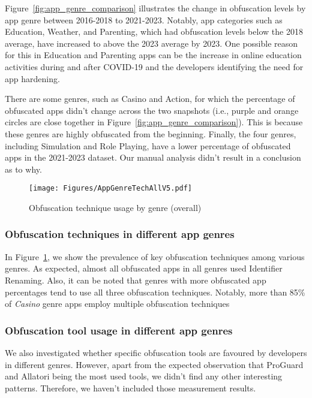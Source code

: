 Figure~\ref{fig:app_genre_comparison} illustrates the change in obfuscation levels by app genre between 2016-2018 to 2021-2023. Notably, app categories such as Education, Weather, and Parenting, which had obfuscation levels below the 2018 average, have increased to above the 2023 average by 2023. One possible reason for this in Education and Parenting apps can be the increase in online education activities during and after COVID-19 and the developers identifying the need for app hardening.

There are some genres, such as Casino and Action, for which the percentage of obfuscated apps didn't change across the two snapshots (i.e., purple and orange circles are close together in Figure~\ref{fig:app_genre_comparison}). This is because these genres are highly obfuscated from the beginning. Finally, the four genres, including Simulation and Role Playing, have a lower percentage of obfuscated apps in the 2021-2023 dataset. Our manual analysis didn't result in a conclusion as to why.


\begin{figure}[!h]
    \centering
    \texttt{[image: Figures/AppGenreTechAllV5.pdf]}
    \caption{Obfuscation technique usage by genre (overall)}
    \label{fig:app_genre_all_tech}
\end{figure}


\subsubsection{Obfuscation techniques in different app genres} In Figure~\ref{fig:app_genre_all_tech}, we show the prevalence of key obfuscation techniques among various genres. As expected, almost all obfuscated apps in all genres used  Identifier Renaming. Also, it can be noted that genres with more obfuscated app percentages tend to use all three obfuscation techniques. Notably, more than 85\% of \textit{Casino} genre apps employ multiple obfuscation techniques

\subsubsection{Obfuscation tool usage in different app genres} We also investigated whether specific obfuscation tools are favoured by developers in different genres. However, apart from the expected observation that  ProGuard and Allatori being the most used tools, we didn't find any other interesting patterns. Therefore, we haven't included those measurement results.

